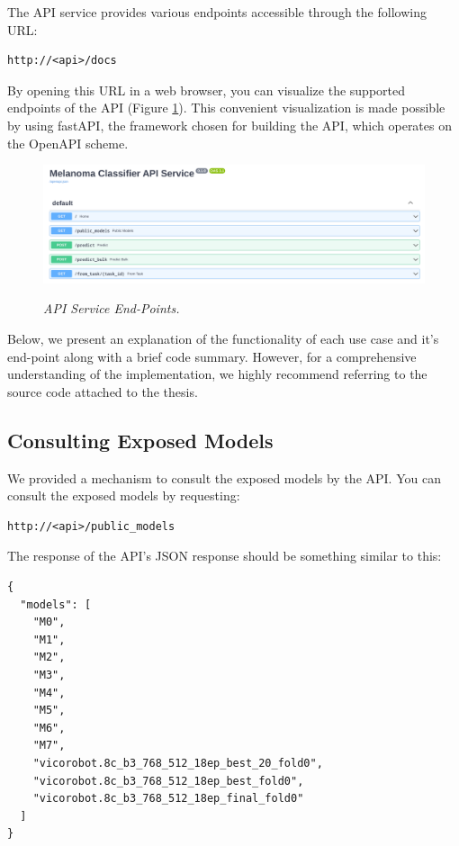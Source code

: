 The API service provides various endpoints accessible through the following URL:

\begin{Verbatim}[fontsize=\scriptsize]
http://<api>/docs
\end{Verbatim}

By opening this URL in a web browser, you can visualize the supported endpoints of the API
(Figure \ref{fig:api-endpoints}). This convenient visualization is made possible by using fastAPI,
the framework chosen for building the API, which operates on the OpenAPI scheme.

\begin{figure}[H]
  \centering
  \begin{adjustbox}{width=\textwidth, trim={0.2cm 0cm 0.1cm 0cm}, clip}
    \includegraphics[width=\textwidth]{imatges/results/api-endpoints.png}
  \end{adjustbox}
  \caption[API Service End-Points]{\textit{API Service End-Points. }}
  {\label{fig:api-endpoints}}
\end{figure}

Below, we present an explanation of the functionality of each use case and it's
end-point along with a brief code summary. However, for a comprehensive
understanding of the implementation, we highly recommend referring to the
source code attached to the thesis.

\subsection{Consulting Exposed Models}

We provided a mechanism to consult the exposed models by the API.
You can consult the exposed models by requesting:

\begin{Verbatim}[fontsize=\scriptsize]
http://<api>/public_models
\end{Verbatim}

The response of the API's JSON response should be something similar to this:

\begin{Verbatim}[fontsize=\scriptsize]
{
  "models": [
    "M0",
    "M1",
    "M2",
    "M3",
    "M4",
    "M5",
    "M6",
    "M7",
    "vicorobot.8c_b3_768_512_18ep_best_20_fold0",
    "vicorobot.8c_b3_768_512_18ep_best_fold0",
    "vicorobot.8c_b3_768_512_18ep_final_fold0"
  ]
}
\end{Verbatim}



